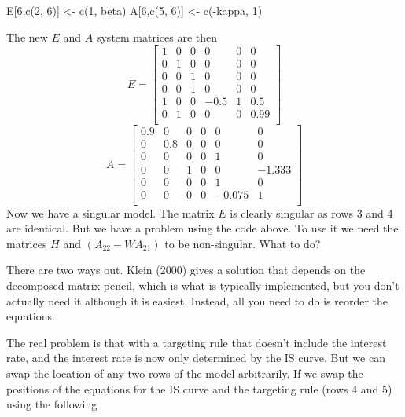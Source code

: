 \documentclass[
  letterpaper,
]{book}
\newenvironment{Shaded}{\begin{snugshade}}{\end{snugshade}}
\newcommand{\DecValTok}[1]{\textcolor[rgb]{0.68,0.00,0.00}{#1}}
\newcommand{\FunctionTok}[1]{\textcolor[rgb]{0.28,0.35,0.67}{#1}}
\newcommand{\NormalTok}[1]{\textcolor[rgb]{0.00,0.23,0.31}{#1}}
\newcommand{\OtherTok}[1]{\textcolor[rgb]{0.00,0.23,0.31}{#1}}
\newcommand{\SpecialCharTok}[1]{\textcolor[rgb]{0.37,0.37,0.37}{#1}}
\begin{document}
\begin{Shaded}
\begin{Highlighting}[]
\NormalTok{E[}\DecValTok{6}\NormalTok{,}\FunctionTok{c}\NormalTok{(}\DecValTok{2}\NormalTok{, }\DecValTok{6}\NormalTok{)]     }\OtherTok{\textless{}{-}} \FunctionTok{c}\NormalTok{(}\DecValTok{1}\NormalTok{, beta)}
\NormalTok{A[}\DecValTok{6}\NormalTok{,}\FunctionTok{c}\NormalTok{(}\DecValTok{5}\NormalTok{, }\DecValTok{6}\NormalTok{)]     }\OtherTok{\textless{}{-}} \FunctionTok{c}\NormalTok{(}\SpecialCharTok{{-}}\NormalTok{kappa, }\DecValTok{1}\NormalTok{)}
\end{Highlighting}
\end{Shaded}

The new \(E\) and \(A\) system matrices are then \[  
E = \left[\begin{matrix}1 &0 &0 &0 &0 &0 \\0 &1 &0 &0 &0 &0 \\0 &0 &1 &0 &0 &0 \\0 &0 &1 &0 &0 &0 \\1 &0 &0 &-0.5 &1 &0.5 \\0 &1 &0 &0 &0 &0.99 \\\end{matrix}\right] 
\] \[  
A = \left[\begin{matrix}0.9 &0 &0 &0 &0 &0 \\0 &0.8 &0 &0 &0 &0 \\0 &0 &0 &0 &1 &0 \\0 &0 &1 &0 &0 &-1.333 \\0 &0 &0 &0 &1 &0 \\0 &0 &0 &0 &-0.075 &1 \\\end{matrix}\right] 
\] Now we have a singular model. The matrix \(E\) is clearly singular as
rows 3 and 4 are identical. But we have a problem using the code above.
To use it we need the matrices \(H\) and \((A_{22} - W A_{21})\) to be
non-singular. What to do?

There are two ways out. Klein (2000) gives a solution that depends on
the decomposed matrix pencil, which is what is typically implemented,
but you don't actually need it although it is easiest. Instead, all you
need to do is reorder the equations.

The real problem is that with a targeting rule that doesn't include the
interest rate, and the interest rate is now only determined by the IS
curve. But we can swap the location of any two rows of the model
arbitrarily. If we swap the positions of the equations for the IS curve
and the targeting rule (rows 4 and 5) using the following
\end{document}
